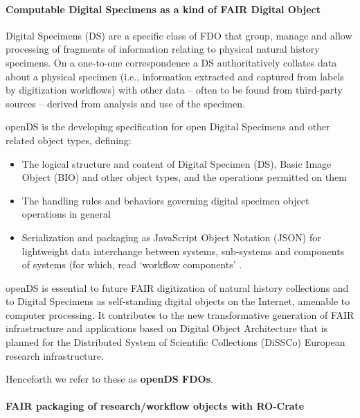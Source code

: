 \paragraph{Computable Digital Specimens as a kind of FAIR Digital Object}\label{computable-digital-specimens-as-a-kind-of-fair-digital-object}

Digital Specimens (DS) are a specific class of FDO that group, manage
and allow processing of fragments of information relating to physical
natural history specimens. On a one-to-one correspondence a DS
authoritatively collates data about a physical specimen (i.e.,
information extracted and captured from labels by digitization
workflows) with other data -- often to be found from third-party sources
-- derived from analysis and use of the specimen.

openDS \cite{ch8-47} is the developing specification for open Digital
Specimens and other related object types, defining: 

\begin{itemize}
  \item The logical
  structure and content of Digital Specimen (DS), Basic Image Object (BIO)
  and other object types, and the operations permitted on them
  \item The
  handling rules and behaviors governing digital specimen object
  operations in general
  \item Serialization and packaging as
  JavaScript Object Notation (JSON) for lightweight data interchange
  between systems, sub-systems and components of systems (for which, read
  `workflow components' \cite{ch8-48}. 
\end{itemize}

openDS is essential to future FAIR
digitization of natural history collections and to Digital Specimens as
self-standing digital objects on the Internet, amenable to computer
processing. It contributes to the new transformative generation of FAIR
infrastructure and applications based on Digital Object Architecture
that is planned for the Distributed System of Scientific Collections
(DiSSCo) \cite{ch8-6,ch8-5,ch8-30} European research infrastructure.

Henceforth we refer to these as \textbf{openDS FDOs}.

\paragraph{FAIR packaging of research/workflow objects with RO-Crate}\label{ch8:fair-packaging-of-researchworkflow-objects-with-ro-crate}

